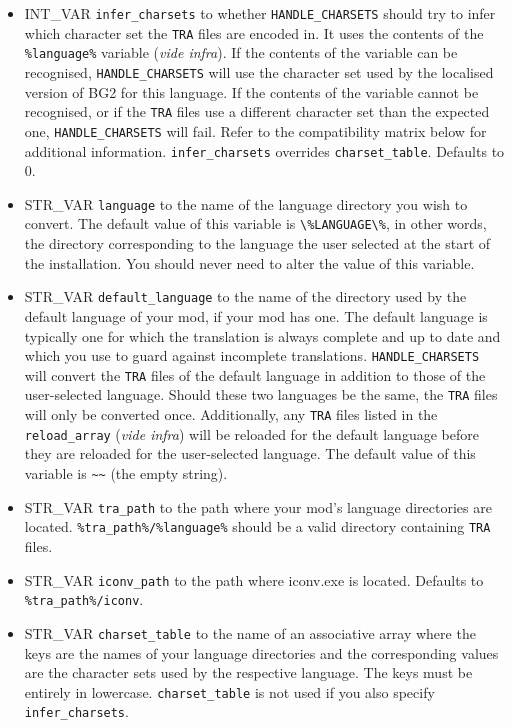 \documentclass{article}
\def\t#1{{\tt #1}}
\begin{document}
\begin{itemize}
\item INT_VAR \verb+infer_charsets+ to whether \verb+HANDLE_CHARSETS+ should try to infer which character set the \t{TRA} files are encoded in. It uses the contents of the \t{\%language\%} variable (\textit{vide infra}). If the contents of the variable can be recognised, \verb+HANDLE_CHARSETS+ will use the character set used by the localised version of BG2 for this language. If the contents of the variable cannot be recognised, or if the \t{TRA} files use a different character set than the expected one, \verb+HANDLE_CHARSETS+ will fail. Refer to the compatibility matrix below for additional information. \verb+infer_charsets+ overrides \verb+charset_table+. Defaults to 0.
\item STR_VAR \verb+language+ to the name of the language directory you wish to convert. The default value of this variable is \verb+\%LANGUAGE\%+, in other words, the directory corresponding to the language the user selected at the start of the installation. You should never need to alter the value of this variable.
\item STR_VAR \verb+default_language+ to the name of the directory used by the default language of your mod, if your mod has one. The default language is typically one for which the translation is always complete and up to date and which you use to guard against incomplete translations. \verb+HANDLE_CHARSETS+ will convert the \t{TRA} files of the default language in addition to those of the user-selected language. Should these two languages be the same, the \t{TRA} files will only be converted once. Additionally, any \t{TRA} files listed in the \verb+reload_array+ (\textit{vide infra}) will be reloaded for the default language before they are reloaded for the user-selected language. The default value of this variable is \verb+~~+ (the empty string).
\item STR_VAR \verb+tra_path+ to the path where your mod's language directories are located. \verb+%tra_path%/%language%+ should be a valid directory containing \t{TRA} files.
\item STR_VAR \verb+iconv_path+ to the path where iconv.exe is located. Defaults to \verb+%tra_path%/iconv+.
\item STR_VAR \verb+charset_table+ to the name of an associative array where the keys are the names of your language directories and the corresponding values are the character sets used by the respective language. The keys must be entirely in lowercase. \verb+charset_table+ is not used if you also specify \verb+infer_charsets+.

\end{itemize}
\end{document}
